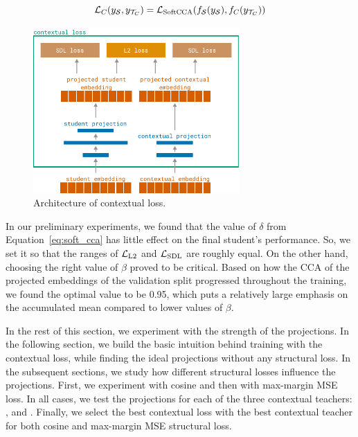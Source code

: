 \begin{equation}\label{eq:contextual_loss}
  \mathcal{L}_C(y_{\mathcal{S}}, y_{\mathcal{T}_C}) = \mathcal{L}_{\text{SoftCCA}}(
    f_{\mathcal{S}}(y_{\mathcal{S}}),
    f_C(y_{\mathcal{T}_C})
  )
\end{equation}

\begin{figure}

  \centering
  \includegraphics[width=0.7\textwidth]{img/contextual_loss.pdf}

  \caption{Architecture of contextual loss.}

  \label{fig:contextual_loss}

\end{figure}

In our preliminary experiments, we found that the value of $\delta$ from
Equation~\ref{eq:soft_cca} has little effect on the final student's
performance. So, we set it so that the ranges of $\mathcal{L}_{\text{L2}}$ and
$\mathcal{L}_{\text{SDL}}$ are roughly equal. On the other hand, choosing the right
value of $\beta$ proved to be critical. Based on how the CCA of the projected
embeddings of the validation split progressed throughout the training, we found
the optimal value to be 0.95, which puts a relatively large emphasis on the
accumulated mean compared to lower values of $\beta$.

In the rest of this section, we experiment with the strength of the
projections. In the following section, we build the basic intuition behind
training with the contextual loss, while finding the ideal projections without
any structural loss. In the subsequent sections, we study how different
structural losses influence the projections. First, we experiment with cosine
and then with max-margin MSE loss. In all cases, we test the projections for
each of the three contextual teachers: ,  and
. Finally, we select the best contextual loss with the best
contextual teacher for both cosine and max-margin MSE structural loss.

